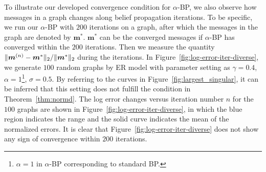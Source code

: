 To illustrate our developed convergence condition for $\alpha$-BP, we also observe how messages in a graph changes along belief propagation iterations. To be specific, we run our $\alpha$-BP with $200$ iterations on a graph, after which the messages in the graph are denoted by $\bm{m}^{\ast}$. $\bm{m}^{\ast}$ can be the converged messages if $\alpha$-BP has converged within the $200$ iterations. Then we measure the quantity $\| \bm{m}^{(n)} - \bm{m}^{\ast} \|_{2}/\| \bm{m}^{\ast} \|_{2}$ during the iterations. In Figure~\ref{fig:log-error-iter-diverse}, we generate $100$ random graphs by ER model with parameter setting as $\gamma =0.4$, $\alpha = 1$\footnote{$\alpha=1$ in $\alpha$-BP corresponding to standard BP.}, $\sigma = 0.5$. By referring to the curves in Figure~\ref{fig:largest_singular}, it can be inferred that this setting does not fulfill the condition in Theorem~\ref{thm:normd}. The log error changes versus iteration number $n$ for the $100$ graphs are shown in Figure~\ref{fig:log-error-iter-diverse}, in which the blue region indicates the range and the solid curve indicates the mean of the normalized errors. It is clear that Figure~\ref{fig:log-error-iter-diverse} does not show any sign of convergence within $200$ iterations.

